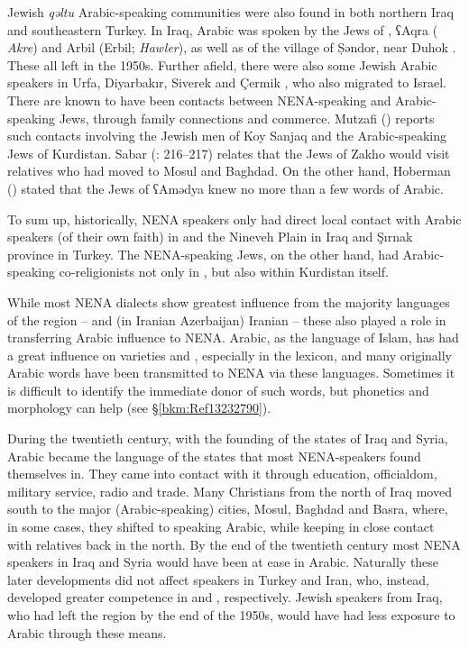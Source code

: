 \documentclass[output=paper]{langsci/langscibook}
\begin{document}
Jewish \textit{qəltu} Arabic-speaking communities were also found in both northern Iraq and southeastern Turkey. In Iraq, Arabic was spoken by the {Jews} of , ʕAqra ( \textit{Akre}) and Arbil (Erbil;  \textit{Hawler}), as well as of the village of Ṣəndor, near Duhok \citep[9]{Hoberman1989}. These all left in the 1950s. Further afield, there were also some Jewish Arabic speakers in Urfa, Diyarbakır, Siverek and Çermik \citep[4]{Jastrow1978}, who also migrated to Israel. There are known to have been contacts between NENA-speaking and Arabic-speaking {Jews}, through family connections and commerce. Mutzafi (\citeyear[6]{Mutzafi2004}) reports such contacts involving the Jewish men of Koy Sanjaq and the Arabic-speaking {Jews} of Kurdistan. Sabar (\citeyear{Sabar1978}: 216–217) relates that the {Jews} of Zakho would visit relatives who had moved to Mosul and Baghdad. On the other hand, Hoberman (\citeyear[9]{Hoberman1989}) stated that the {Jews} of ʕAmədya knew no more than a few words of  Arabic.

To sum up, historically,  NENA speakers only had direct local contact with Arabic speakers (of their own faith) in  and the Nineveh Plain in Iraq and Şırnak province in Turkey. The NENA-speaking {Jews}, on the other hand, had Arabic-speaking co-religionists not only in , but also within  Kurdistan itself.

While most NENA dialects show greatest influence from the majority languages of the region –  and (in Iranian Azerbaijan) Iranian  – these also played a role in transferring Arabic influence to NENA. Arabic, as the language of Islam, has had a great influence on  varieties and , especially in the lexicon, and many originally Arabic words have been transmitted to NENA via these languages. Sometimes it is difficult to identify the immediate donor of such words, but phonetics and morphology can help (see §\ref{bkm:Ref13232790}).

During the twentieth century, with the founding of the states of Iraq and Syria, Arabic became the language of the states that most NENA-speakers found themselves in. They came into contact with it through education, officialdom, military service, radio and trade. Many {Christians} from the north of Iraq moved south to the major (Arabic-speaking) cities, Mosul, Baghdad and Basra, where, in some cases, they shifted to speaking Arabic, while keeping in close contact with relatives back in the north. By the end of the twentieth century most NENA speakers in Iraq and Syria would have been at ease in Arabic. Naturally these later developments did not affect speakers in Turkey and Iran, who, instead, developed greater competence in  and , respectively. Jewish speakers from Iraq, who had left the region by the end of the 1950s, would have had less exposure to Arabic through these means.
\end{document}
